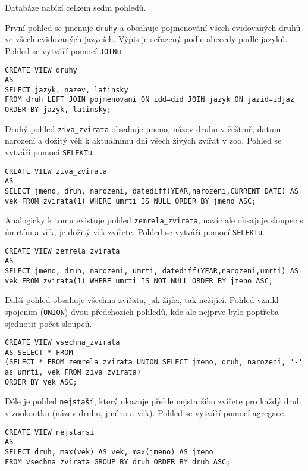 \documentclass{article}
\begin{document}
Databáze nabízí celkem sedm pohledů.

První pohled se jmenuje \texttt{druhy} a obsahuje pojmenování všech evidovaných druhů ve všech evidovaných jazycích. Výpis je seřazený podle abecedy podle jazyků. Pohled se vytváří pomocí \texttt{JOINu}.

\begin{lstlisting}
CREATE VIEW druhy 
AS
SELECT jazyk, nazev, latinsky 
FROM druh LEFT JOIN pojmenovani ON idd=did JOIN jazyk ON jazid=idjaz ORDER BY jazyk, latinsky;
\end{lstlisting}

Druhý pohled \texttt{ziva\_zvirata} obsahuje jmeno, název druhu v češtině, datum narození a dožitý věk k aktuálnímu dni všech živých zvířat v zoo. Pohled se vytváří pomocí \texttt{SELEKTu}.

\begin{lstlisting}
CREATE VIEW ziva_zvirata
AS
SELECT jmeno, druh, narozeni, datediff(YEAR,narozeni,CURRENT_DATE) AS vek FROM zvirata(1) WHERE umrti IS NULL ORDER BY jmeno ASC;
\end{lstlisting}

Analogicky k tomu existuje pohled \texttt{zemrela\_zvirata}, navíc ale obsajuje sloupec s úmrtím a věk, je dožitý věk zvířete. Pohled se vytváří pomocí \texttt{SELEKTu}.

\begin{lstlisting}
CREATE VIEW zemrela_zvirata
AS
SELECT jmeno, druh, narozeni, umrti, datediff(YEAR,narozeni,umrti) AS vek FROM zvirata(1) WHERE umrti IS NOT NULL ORDER BY jmeno ASC;
\end{lstlisting}

Další pohled obsahuje všechna zvířata, jak žijíci, tak nežíjící. Pohled vznikl spojením (\texttt{UNION}) dvou předchozích pohledů, kde ale nejprve bylo poptřeba sjednotit počet sloupců. 

\begin{lstlisting}
CREATE VIEW vsechna_zvirata
AS SELECT * FROM 
(SELECT * FROM zemrela_zvirata UNION SELECT jmeno, druh, narozeni, '-' as umrti, vek FROM ziva_zvirata)
ORDER BY vek ASC;
\end{lstlisting}

Déle je pohled \texttt{nejstaší}, který ukazuje přehle nejstaršího zvířete pro každý druh v zookoutku (název druhu, jméno a věk). Pohled se vytváří pomocí agregace.

\begin{lstlisting}
CREATE VIEW nejstarsi
AS
SELECT druh, max(vek) AS vek, max(jmeno) AS jmeno
FROM vsechna_zvirata GROUP BY druh ORDER BY druh ASC;
\end{lstlisting}
\end{document}
